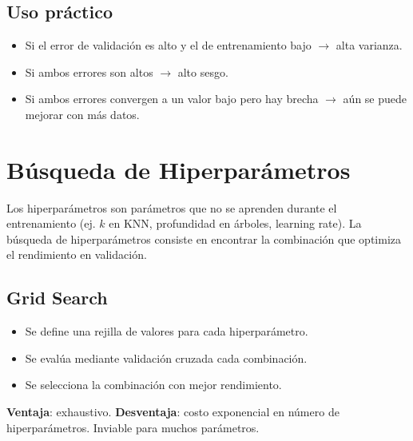 \documentclass[12pt,a4paper,openany,oneside]{book}
\begin{document}
\begin{center}
\caption{Curvas de aprendizaje típicas de un modelo con alta varianza (gran brecha). Añadir datos ayuda.}
\end{center}

\subsection{Uso práctico}
\begin{itemize}
    \item Si el error de validación es alto y el de entrenamiento bajo $\rightarrow$ alta varianza.
    \item Si ambos errores son altos $\rightarrow$ alto sesgo.
    \item Si ambos errores convergen a un valor bajo pero hay brecha $\rightarrow$ aún se puede mejorar con más datos.
\end{itemize}

\section{Búsqueda de Hiperparámetros}

Los hiperparámetros son parámetros que no se aprenden durante el entrenamiento (ej. \(k\) en KNN, profundidad en árboles, learning rate). La búsqueda de hiperparámetros consiste en encontrar la combinación que optimiza el rendimiento en validación.

\subsection{Grid Search}
\begin{itemize}
    \item Se define una rejilla de valores para cada hiperparámetro.
    \item Se evalúa mediante validación cruzada cada combinación.
    \item Se selecciona la combinación con mejor rendimiento.
\end{itemize}
\textbf{Ventaja}: exhaustivo. \textbf{Desventaja}: costo exponencial en número de hiperparámetros. Inviable para muchos parámetros.
\end{document}
